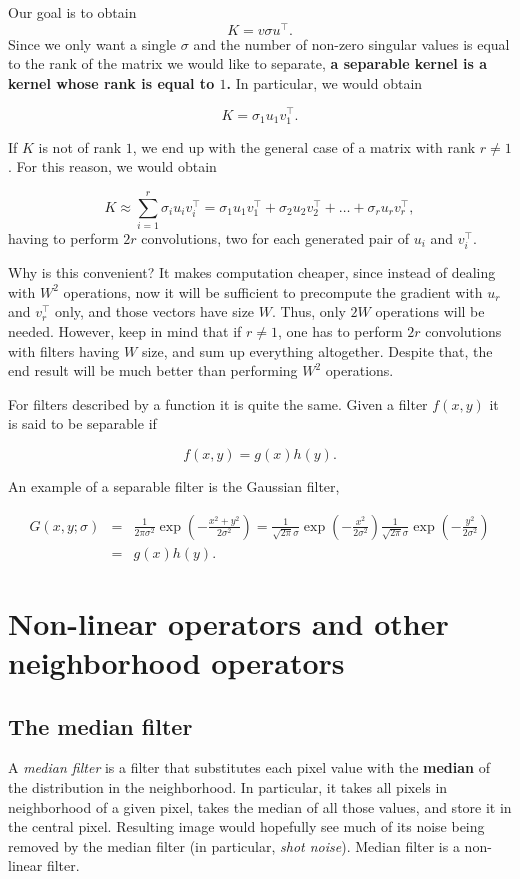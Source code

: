\documentclass[10pt]{report}
\begin{document}
Our goal is to obtain \[K = v\sigma u^\top.\] Since we only want a
single \(\sigma\) and the number of non-zero singular values is equal to
the rank of the matrix we would like to separate, \textbf{a separable kernel is
a kernel whose rank is equal to \(1\).} In particular, we would obtain

\[K = \sigma_1 u_1 v_1^\top.\]

If \(K\) is not of rank \(1\), we end up with the general case of a
matrix with rank \(r \neq 1\). For this reason, we would obtain

\[ K \approx \sum_{i=1}^r \sigma_i u_i v_i^\top = \sigma_1 u_1 v_1^\top + \sigma_2 u_2 v_2^\top + \dots + \sigma_r u_r v_r^\top,\]
having to perform \(2r\) convolutions, two for each generated pair of
\(u_i\) and \(v_i^\top\).

Why is this convenient? It makes computation cheaper, since instead of
dealing with \(W^2\) operations, now it will be sufficient to precompute
the gradient with \(u_r\) and \(v_r^\top\) only, and those vectors have
size \(W\). Thus, only \(2W\) operations will be needed. However, keep
in mind that if \(r \neq 1\), one has to perform \(2r\) convolutions
with filters having \(W\) size, and sum up everything altogether.
Despite that, the end result will be much better than performing \(W^2\)
operations.

For filters described by a function it is quite the same. Given a filter
\(f(x, y)\) it is said to be separable if

\[f(x, y) = g(x)h(y).\]

An example of a separable filter is the Gaussian filter,

\[\begin{array}{lll} G(x,y;\sigma) & = &\displaystyle  \frac{1}{2\pi \sigma^2}\exp{\left(-\frac{x^2 + y^2}{2 \sigma^2}\right)} = \frac{1}{\sqrt{2\pi} \sigma} \exp{\left(-\frac{x^2}{2\sigma^2}\right)}\frac{1}{\sqrt{2\pi} \sigma} \exp{\left(-\frac{y^2}{2\sigma^2}\right)} \\ & = & g(x)h(y).\end{array}\]

\section{Non-linear operators and other neighborhood operators}
\label{non-linear-operators-and-other-neighborhood-operators}
\subsection{The median filter}
\label{the-median-filter}
A \emph{median filter} is a filter that substitutes each pixel value with the
\textbf{median} of the distribution in the neighborhood. In particular, it
takes all pixels in neighborhood of a given pixel, takes the median of
all those values, and store it in the central pixel. Resulting image
would hopefully see much of its noise being removed by the median filter
(in particular, \emph{shot noise}). Median filter is a non-linear filter.
\end{document}
